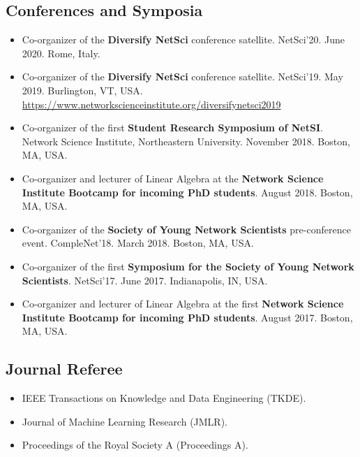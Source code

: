 \documentclass[12pt,]{scrartcl}
\begin{document}
\subsection{Conferences and Symposia}\label{conferences}

\begin{itemize}
\leftskip-0.25in

\item Co-organizer of the \textbf{Diversify NetSci} conference satellite. NetSci'20. June 2020. Rome, Italy.

\item Co-organizer of the \textbf{Diversify NetSci} conference satellite. NetSci'19. May 2019. Burlington, VT, USA. \url{https://www.networkscienceinstitute.org/diversifynetsci2019}

\item Co-organizer of the first \textbf{Student Research Symposium of NetSI}. Network Science Institute, Northeastern University. November 2018. Boston, MA, USA.

\item Co-organizer and lecturer of Linear Algebra at the \textbf{Network Science Institute Bootcamp for incoming PhD students}. August 2018. Boston, MA, USA.

\item Co-organizer of the \textbf{Society of Young Network Scientists} pre-conference event. CompleNet'18. March 2018. Boston, MA, USA.

\item Co-organizer of the first \textbf{Symposium for the Society of Young Network Scientists}. NetSci'17. June 2017. Indianapolis, IN, USA.

\item Co-organizer and lecturer of Linear Algebra at the first \textbf{Network Science Institute Bootcamp for incoming PhD students}. August 2017. Boston, MA, USA.

\end{itemize}


\subsection{Journal Referee}\label{journal-referee}

\begin{itemize}
\leftskip-0.25in

\item IEEE Transactions on Knowledge and Data Engineering (TKDE).

\item Journal of Machine Learning Research (JMLR).

\item Proceedings of the Royal Society A (Proceedings A).

\end{itemize}
\end{document}
